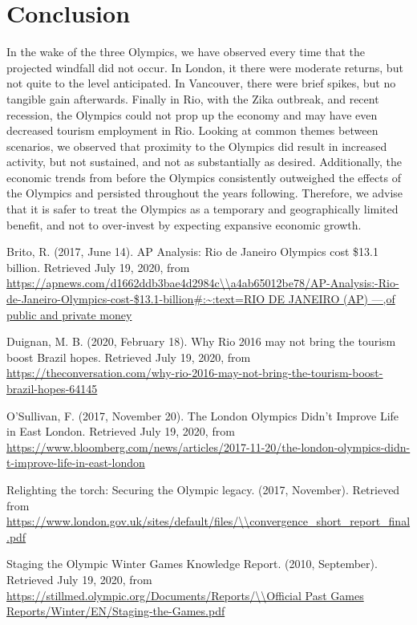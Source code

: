 \documentclass[11pt, twocolumn]{article}
\begin{document}
\section{Conclusion}

In the wake of the three Olympics, we have observed every time that the projected windfall did not occur. In London, it there were moderate returns, but not quite to the level anticipated. In Vancouver, there were brief spikes, but no tangible gain afterwards. Finally in Rio, with the Zika outbreak, and recent recession, the Olympics could not prop up the economy and may have even decreased tourism employment in Rio. Looking at common themes between scenarios, we observed that proximity to the Olympics did result in increased activity, but not sustained, and not as substantially as desired. Additionally, the economic trends from before the Olympics consistently outweighed the effects of the Olympics and persisted throughout the years following. Therefore, we advise that it is safer to treat the Olympics as a temporary and geographically limited benefit, and not to over-invest by expecting expansive economic growth.





\begin{thebibliography}{12}

Brito, R. (2017, June 14). AP Analysis: Rio de Janeiro Olympics cost \$13.1 billion. Retrieved July 19, 2020, from \url{https://apnews.com/d1662ddb3bae4d2984c\\a4ab65012be78/AP-Analysis:-Rio-de-Janeiro-Olympics-cost-\$13.1-billion#:~:text=RIO DE JANEIRO (AP) —,of public and private money}

Duignan, M. B. (2020, February 18). Why Rio 2016 may not bring the tourism boost Brazil hopes. Retrieved July 19, 2020, from \url{https://theconversation.com/why-rio-2016-may-not-bring-the-tourism-boost-brazil-hopes-64145}

O'Sullivan, F. (2017, November 20). The London Olympics Didn't Improve Life in East London. Retrieved July 19, 2020, from \url{https://www.bloomberg.com/news/articles/2017-11-20/the-london-olympics-didn-t-improve-life-in-east-london}

Relighting the torch: Securing the Olympic legacy. (2017, November). Retrieved from \url{https://www.london.gov.uk/sites/default/files/\\convergence\_short\_report\_final.pdf}

Staging the Olympic Winter Games Knowledge Report. (2010, September). Retrieved July 19, 2020, from \url{https://stillmed.olympic.org/Documents/Reports/\\Official Past Games Reports/Winter/EN/Staging-the-Games.pdf}

\end{thebibliography}
\end{document}
